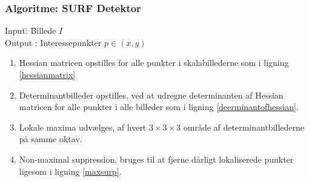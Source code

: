 \subsubsection*{Algoritme: SURF Detektor}
\begin{tabbing}
Input\quad \= : \= Billede $I$\\
Output \text{ } \> : \> Interessepunkter $p \in (x,y)$
\end{tabbing}
\begin{enumerate}
\item {Hessian matricen opstilles for alle punkter i skalabillederne som i ligning \eqref{hessianmatrix}}
\item Determinantbilleder opstilles, ved at udregne determinanten af Hessian matricen for alle punkter i alle billeder som i ligning \eqref{deerminantofhessian}.
\item Lokale maxima udvælges, af hvert $3\times3\times3$ område af determinantbillederne på samme oktav.
\item Non-maximal suppression, bruges til at fjerne dårligt lokaliserede punkter ligesom i ligning \eqref{maxsurp}.
\end{enumerate}